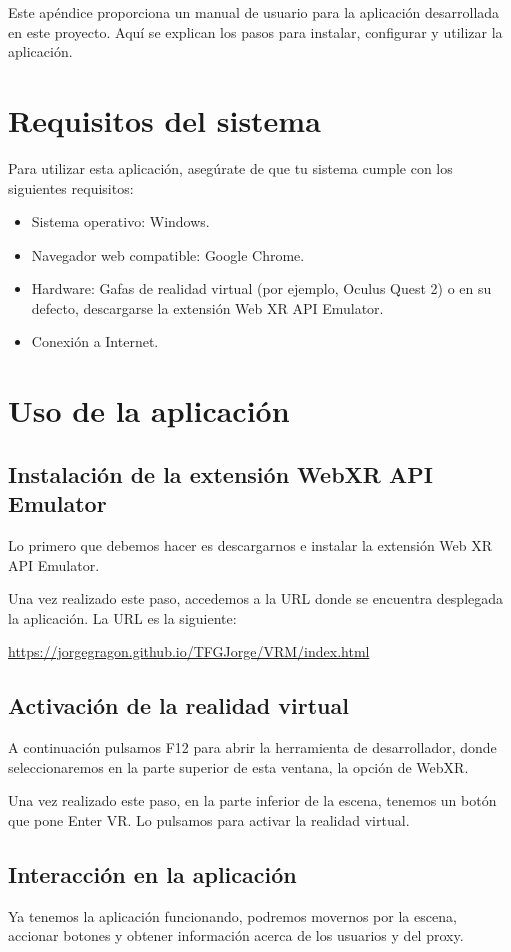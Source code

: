 \documentclass[a4paper, 12pt]{book}
\begin{document}
Este apéndice proporciona un manual de usuario para la aplicación desarrollada en este proyecto. 
Aquí se explican los pasos para instalar, configurar y utilizar la aplicación.

\section{Requisitos del sistema}
Para utilizar esta aplicación, asegúrate de que tu sistema cumple con los siguientes requisitos:
\begin{itemize}
    \item Sistema operativo: Windows.
    \item Navegador web compatible: Google Chrome.
    \item Hardware: Gafas de realidad virtual (por ejemplo, Oculus Quest 2) o en su defecto, descargarse la extensión Web XR API Emulator.
    \item Conexión a Internet.
\end{itemize}

\section{Uso de la aplicación}
\subsection{Instalación de la extensión WebXR API Emulator}
Lo primero que debemos hacer es descargarnos e instalar la extensión 
Web XR API Emulator.

Una vez realizado este paso, accedemos a la URL donde se encuentra 
desplegada la aplicación. La URL es la siguiente:

\url{https://jorgegragon.github.io/TFGJorge/VRM/index.html}


\subsection{Activación de la realidad virtual}
A continuación pulsamos F12 para abrir la herramienta de desarrollador, 
donde seleccionaremos en la parte superior de esta ventana, la opción de WebXR.

Una vez realizado este paso, en la parte inferior de la escena, tenemos 
un botón que pone Enter VR. Lo pulsamos para activar la realidad virtual.

\subsection{Interacción en la aplicación}
Ya tenemos la aplicación funcionando, podremos movernos por la escena, 
accionar botones y obtener información acerca de los usuarios y del proxy.
\end{document}
